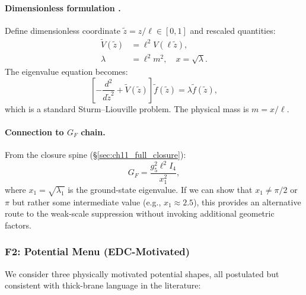 \paragraph{Dimensionless formulation \tagDc{}.}
Define dimensionless coordinate $\tilde{z} = z/\ell \in [0,1]$ and rescaled quantities:
\begin{align}
    \tilde{V}(\tilde{z}) &= \ell^2 V(\ell\tilde{z}), \label{eq:attemptF_Vtilde} \\
    \lambda &= \ell^2 m^2, \quad x = \sqrt{\lambda}. \label{eq:attemptF_lambda}
\end{align}
The eigenvalue equation becomes:
\begin{equation}
    \left[ -\frac{d^2}{d\tilde{z}^2} + \tilde{V}(\tilde{z}) \right] \tilde{f}(\tilde{z}) = \lambda \tilde{f}(\tilde{z}),
    \label{eq:attemptF_dimensionless}
\end{equation}
which is a standard Sturm--Liouville problem. The physical mass is $m = x/\ell$.

\paragraph{\texorpdfstring{Connection to $G_F$ chain.}{Connection to GF chain.}}
From the closure spine (\S\ref{sec:ch11_full_closure}):
\begin{equation}
    G_F = \frac{g_5^2 \ell^2 I_4}{x_1^2},
\end{equation}
where $x_1 = \sqrt{\lambda_1}$ is the ground-state eigenvalue. If we can show that
$x_1 \neq \pi/2$ or $\pi$ but rather some intermediate value (e.g., $x_1 \approx 2.5$),
this provides an alternative route to the weak-scale suppression without invoking
additional geometric factors.

\subsubsection{F2: Potential Menu (EDC-Motivated)}
\label{sec:attemptF_potentials}

We consider three physically motivated potential shapes, all postulated \tagP{}
but consistent with thick-brane language in the literature:

